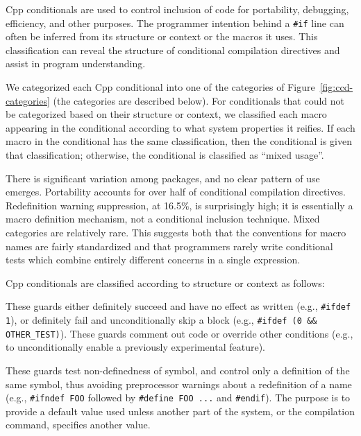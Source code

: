 \documentclass[10pt]{article}
\begin{document}
Cpp conditionals are used to control inclusion of code for portability,
debugging, efficiency, and other purposes.  The programmer intention behind
a {\tt \#if} line can often be inferred from its structure or context or
the macros it uses.  This classification can reveal the structure of
conditional compilation directives and assist in program understanding.

We categorized each Cpp conditional into one of the categories of
Figure~\ref{fig:ccd-categories} (the categories are described below).  For
conditionals that could not be categorized based on their structure or
context, we classified each macro appearing in the conditional according to
what system properties it reifies.  If each macro in the conditional has the
same classification, then the conditional is given that classification;
otherwise, the conditional is classified as ``mixed usage''.

There is significant variation among packages, and no clear pattern of use
emerges.  Portability accounts for over half of conditional compilation
directives.  Redefinition warning suppression, at 16.5\%, is surprisingly
high; it is essentially a macro definition mechanism, not a conditional
inclusion technique.  Mixed categories are relatively rare.  This suggests
both that the conventions for macro names are fairly standardized and that
programmers rarely write conditional tests which combine entirely different
concerns in a single expression.


Cpp conditionals are classified according to structure or context as follows:
\begin{description}\itemsep 0pt \parskip 0pt
\item[Commenting] These guards either definitely succeed and
  have no effect as written (e.g., \texttt{\#ifdef 1}), or definitely fail
  and unconditionally skip a block (e.g., {\tt \#ifdef (0 \&\&
  \verb|OTHER_TEST|)}).  These guards comment out code or override other
  conditions (e.g., to unconditionally enable a previously experimental
  feature).
      
\item[Redefinition suppression] These guards test non-definedness of
  symbol, and control only a definition of the same symbol, thus avoiding
  preprocessor warnings about a redefinition of a name (e.g.,
  \texttt{\#ifndef FOO} followed by \texttt{\#define FOO ...} and
  \texttt{\#endif}).  
  The purpose is to provide a default value used unless another part of the
  system, or the compilation command, specifies another value.

\end{description}
\end{document}

